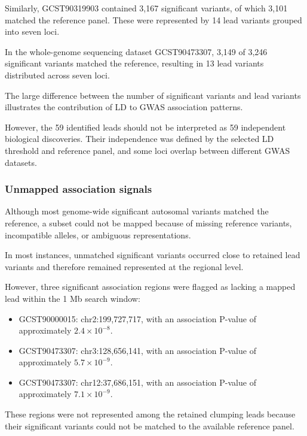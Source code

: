 \documentclass[11pt,a4paper]{article}
\begin{document}
Similarly, GCST90319903 contained 3,167
significant variants, of which 3,101 matched
the reference panel. These were represented
by 14 lead variants grouped into seven loci.

In the whole-genome sequencing dataset
GCST90473307, 3,149 of 3,246 significant
variants matched the reference, resulting
in 13 lead variants distributed across
seven loci.

The large difference between the number
of significant variants and lead variants
illustrates the contribution of LD to
GWAS association patterns.

However, the 59 identified leads should
not be interpreted as 59 independent
biological discoveries. Their independence
was defined by the selected LD threshold
and reference panel, and some loci overlap
between different GWAS datasets.

\subsubsection{Unmapped association signals}

Although most genome-wide significant
autosomal variants matched the reference,
a subset could not be mapped because of
missing reference variants, incompatible
alleles, or ambiguous representations.

In most instances, unmatched significant
variants occurred close to retained
lead variants and therefore remained
represented at the regional level.

However, three significant association
regions were flagged as lacking a mapped
lead within the 1 Mb search window:

\begin{itemize}

\item GCST90000015:
chr2:199,727,717, with an association
P-value of approximately $2.4 \times 10^{-8}$.

\item GCST90473307:
chr3:128,656,141, with an association
P-value of approximately $5.7 \times 10^{-9}$.

\item GCST90473307:
chr12:37,686,151, with an association
P-value of approximately $7.1 \times 10^{-9}$.

\end{itemize}

These regions were not represented among
the retained clumping leads because their
significant variants could not be matched
to the available reference panel.
\end{document}
